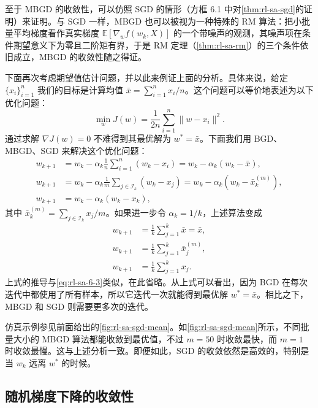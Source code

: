 至于 MBGD 的收敛性，可以仿照 SGD 的情形（方框 6.1 中对\cref{thm:rl-sa-sgd}的证明）来证明。与 SGD 一样，MBGD 也可以被视为一种特殊的 RM 算法：把小批量平均梯度看作真实梯度 $\mathbb{E}[\nabla_w f(w_k, X)]$ 的一个带噪声的观测，其噪声项在条件期望意义下为零且二阶矩有界，于是 RM 定理（\cref{thm:rl-sa-rm}）的三个条件依旧成立，MBGD 的收敛性随之得证。

下面再次考虑期望值估计问题，并以此来例证上面的分析。具体来说，给定 $\{x_i\}_{i=1}^n$ 我们的目标是计算均值 $\bar{x} = \sum_{i=1}^{n} x_i / n$。这个问题可以等价地表述为以下优化问题：
\begin{equation}
\min_w J(w) = \frac{1}{2n} \sum_{i=1}^{n} \| w - x_i \|^2.
\end{equation}
通过求解 $\nabla J(w) = 0$ 不难得到其最优解为 $w^* = \bar{x}$。下面我们用 BGD、MBGD、SGD 来解决这个优化问题：
\begin{align}
w_{k+1} &= w_k - \alpha_k \frac{1}{n} \sum_{i=1}^{n} (w_k - x_i) = w_k - \alpha_k (w_k - \bar{x}), \tag{BGD} \\
w_{k+1} &= w_k - \alpha_k \frac{1}{m} \sum_{j \in \mathcal{I}_k} (w_k - x_j) = w_k - \alpha_k \left( w_k - \bar{x}_k^{(m)} \right), \tag{MBGD} \\
w_{k+1} &= w_k - \alpha_k (w_k - x_k), \tag{SGD}
\end{align}
其中 $\bar{x}_k^{(m)} = \sum_{j \in \mathcal{I}_k} x_j / m$。如果进一步令 $\alpha_k = 1/k$，上述算法变成
\begin{align}
w_{k+1} &= \frac{1}{k} \sum_{j=1}^{k} \bar{x} = \bar{x}, \tag{BGD} \\
w_{k+1} &= \frac{1}{k} \sum_{j=1}^{k} \bar{x}_j^{(m)}, \tag{MBGD} \\
w_{k+1} &= \frac{1}{k} \sum_{j=1}^{k} x_j. \tag{SGD}
\end{align}
上式的推导与\eqref{eq:rl-sa-6-3}类似，在此省略。从上式可以看出，因为 BGD 在每次迭代中都使用了所有样本，所以它迭代一次就能得到最优解 $w^* = \bar{x}$。相比之下，MBGD 和 SGD 则需要更多次的迭代。

仿真示例参见前面给出的\cref{fig:rl-sa-sgd-mean}。如\cref{fig:rl-sa-sgd-mean}所示，不同批量大小的 MBGD 算法都能收敛到最优值，不过 $m = 50$ 时收敛最快，而 $m = 1$ 时收敛最慢。这与上述分析一致。即便如此，SGD 的收敛依然是高效的，特别是当 $w_k$ 远离 $w^*$ 的时候。

\subsection{随机梯度下降的收敛性}
\label{sec:rl-sa-sgd-conv}

